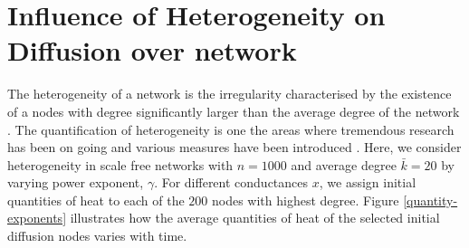 \documentclass[10pt,a4paper]{article}
\begin{document}
     \section{Influence of Heterogeneity on Diffusion over network}
     The heterogeneity of a network is the irregularity characterised by the existence of a nodes with degree significantly larger than the average degree of the network \cite{estrada2010quantifying,albert2002statistical,newman2003structure}.
     The quantification of heterogeneity is one the areas where tremendous research has been on going and various measures have been introduced \cite{estrada2010quantifying}.
     Here, we consider heterogeneity in scale free networks with $n=1000$ and average degree $\bar{k}=20$ by varying power exponent, $\gamma$. For different conductances $x$, we assign initial quantities of heat to each of the $200$ nodes with highest degree. Figure \ref{quantity-exponents} illustrates how the average quantities of heat of the selected initial diffusion nodes varies with time.
\end{document}
